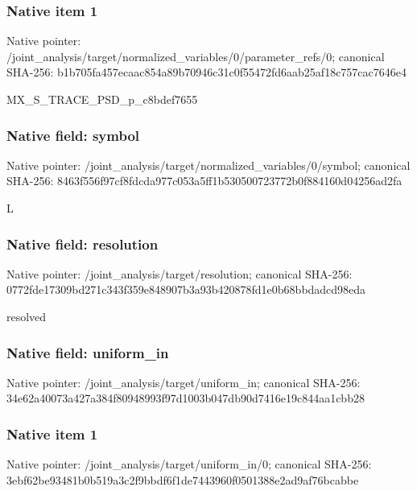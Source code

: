 \documentclass[10pt,a4paper]{article}
\begin{document}
\subsubsection{Native item 1}
Native pointer: /joint\_\allowbreak{}analysis/target/normalized\_\allowbreak{}variables/0/parameter\_\allowbreak{}refs/0; canonical SHA-256: b1b705fa457ecaac854a89b70946c31c0f55472fd6aab25af18c757cac7646e4

\begingroup\raggedright\sloppy MX\_\allowbreak{}S\_\allowbreak{}TRACE\_\allowbreak{}PSD\_\allowbreak{}p\_\allowbreak{}c8bdef7655\par\endgroup

\subsubsection{Native field: symbol}
Native pointer: /joint\_\allowbreak{}analysis/target/normalized\_\allowbreak{}variables/0/symbol; canonical SHA-256: 8463f556f97cf8fdcda977c053a5ff1b530500723772b0f884160d04256ad2fa

\begingroup\raggedright\sloppy L\par\endgroup

\subsubsection{Native field: resolution}
Native pointer: /joint\_\allowbreak{}analysis/target/resolution; canonical SHA-256: 0772fde17309bd271c343f359e848907b3a93b420878fd1e0b68bbdadcd98eda

\begingroup\raggedright\sloppy resolved\par\endgroup

\subsubsection{Native field: uniform\_\allowbreak{}in}
Native pointer: /joint\_\allowbreak{}analysis/target/uniform\_\allowbreak{}in; canonical SHA-256: 34e62a40073a427a384f80948993f97d1003b047db90d7416e19c844aa1cbb28

\subsubsection{Native item 1}
Native pointer: /joint\_\allowbreak{}analysis/target/uniform\_\allowbreak{}in/0; canonical SHA-256: 3ebf62be93481b0b519a3c2f9bbdf6f1de7443960f0501388e2ad9af76bcabbe
\end{document}
